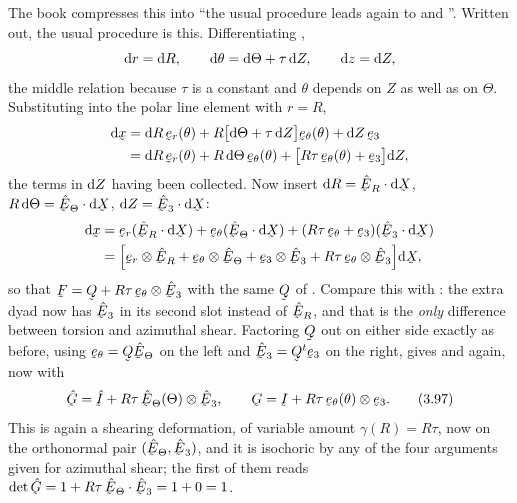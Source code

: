 The book compresses this into ``the usual procedure leads again to
 and ''. Written out, the usual procedure is this.
Differentiating ,
\[
   \mathrm{d} r=\mathrm{d} R,\qquad \mathrm{d}\theta=\mathrm{d}\Theta+\tau\,\mathrm{d} Z,\qquad \mathrm{d} z=\mathrm{d} Z,
\]
the middle relation because $\tau$ is a constant and $\theta$ depends on
$Z$ as well as on $\Theta$. Substituting into the polar line element with
$r=R$,
\[
\begin{aligned}
   \dl\bx&=\dl R\,\ber(\theta)+R\big[\dl\Theta+\tau\,\dl Z\big]\bet(\theta)
          +\dl Z\,\be_{3}\\
   &=\dl R\,\ber(\theta)+R\,\dl\Theta\,\bet(\theta)
     +\big[R\tau\,\bet(\theta)+\be_{3}\big]\dl Z ,
\end{aligned}
\]
the terms in $\mathrm{d} Z$ having been collected. Now insert
$\dl R=\ip{\hER}{\dl\bX}$, $R\,\dl\Theta=\ip{\hETh}{\dl\bX}$,
$\dl Z=\ip{\hbE_{3}}{\dl\bX}$:
\[
\begin{aligned}
   \dl\bx&=\ber(\ip{\hER}{\dl\bX})+\bet(\ip{\hETh}{\dl\bX})
     +(R\tau\,\bet+\be_{3})(\ip{\hbE_{3}}{\dl\bX})\\
   &=\Big[\ber\otimes\hER+\bet\otimes\hETh+\be_{3}\otimes\hbE_{3}
     +R\tau\,\bet\otimes\hbE_{3}\Big]\dl\bX ,
\end{aligned}
\]
so that $\bF=\bQ+R\tau\,\bet\otimes\hbE_{3}$ with the same $\bQ$ of
. Compare this with : the extra dyad now has $\hbE_{3}$ in
its second slot instead of $\hER$, and that is the \emph{only} difference
between torsion and azimuthal shear. Factoring $\bQ$ out on either side
exactly as before, using $\bet=\bQ\hETh$ on the left and
$\hbE_{3}=\bQ^{t}\be_{3}$ on the right, gives  and 
again, now with
\begin{equation}
   \hat\bG=\hI+R\tau\,\hETh(\Theta)\otimes\hbE_{3},
   \qquad
   \bG=\I+R\tau\,\bet(\theta)\otimes\be_{3}.
   \tag{3.97}\label{eq:3.97}
\end{equation}
This is again a shearing deformation, of variable amount
$\gamma(R)=R\tau$, now on the orthonormal pair $(\hETh,\hbE_{3})$, and it
is isochoric by any of the four arguments given for azimuthal shear; the
first of them reads
$\det\hat\bG=1+R\tau\,\ip{\hETh}{\hbE_{3}}=1+0=1$.

